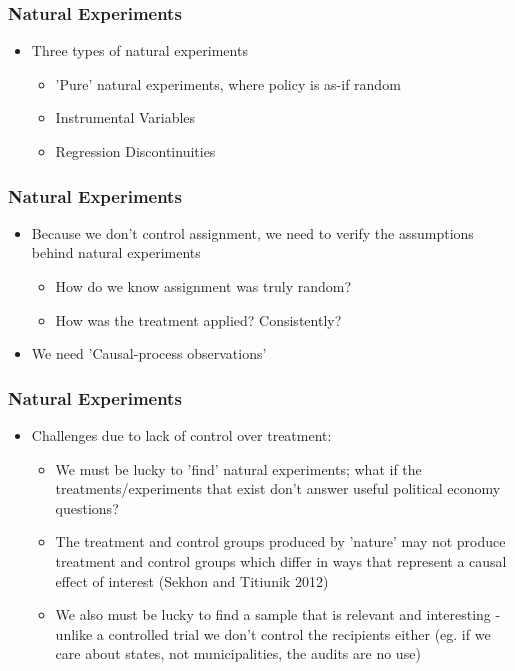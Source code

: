 \documentclass[xcolor=x11names,compress]{beamer}\usepackage[]{graphicx}\usepackage[]{color}
\renewcommand{\(}{\begin{columns}}
\renewcommand{\)}{\end{columns}}
\newcommand{\<}[1]{\begin{column}{#1}}
\renewcommand{\>}{\end{column}}
\begin{document}
\begin{frame}
\frametitle{Natural Experiments}
\begin{itemize}
\item Three types of natural experiments
\begin{itemize}
\item 'Pure' natural experiments, where policy is as-if random
\item Instrumental Variables
\item Regression Discontinuities
\end{itemize}
\end{itemize}
\end{frame}

\begin{frame}
\frametitle{Natural Experiments}
\begin{itemize}
\item Because we don't control assignment, we need to verify the assumptions behind natural experiments
\begin{itemize}
\item How do we know assignment was truly random?
\item How was the treatment applied? Consistently?
\end{itemize}
\item We need 'Causal-process observations'
\end{itemize}
\end{frame}

\begin{frame}
\frametitle{Natural Experiments}
\begin{itemize}
\item Challenges due to lack of control over treatment:
\pause
\begin{itemize}
\item We must be lucky to 'find' natural experiments; what if the treatments/experiments that exist don't answer useful political economy questions?
\item The treatment and control groups produced by 'nature' may not produce treatment and control groups which differ in ways that represent a causal effect of interest (Sekhon and Titiunik 2012)
\item We also must be lucky to find a sample that is relevant and interesting - unlike a controlled trial we don't control the recipients either (eg. if we care about states, not municipalities, the audits are no use)
\end{itemize}
\end{itemize}
\end{frame}
\end{document}
